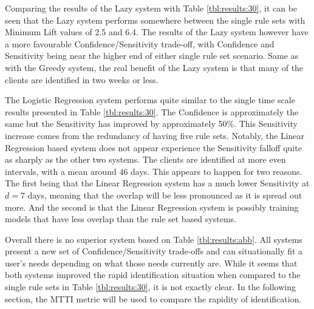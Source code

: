 Comparing the results of the Lazy system with Table \ref{tbl:results:30}, it can be seen that the Lazy system performs somewhere between the single rule sets with Minimum Lift values of 2.5 and 6.4. The results of the Lazy system however have a more favourable Confidence/Sensitivity trade-off, with Confidence and Sensitivity being near the higher end of either single rule set scenario. Same as with the Greedy system, the real benefit of the Lazy system is that many of the clients are identified in two weeks or less.

The Logistic Regression system performs quite similar to the single time scale results presented in Table \ref{tbl:results:30}. The Confidence is approximately the same but the Sensitivity has improved by approximately 50\%. This Sensitivity increase comes from the redundancy of having five rule sets. Notably, the Linear Regression based system does not appear experience the Sensitivity falloff quite as sharply as the other two systems. The clients are identified at more even intervals, with a mean around 46 days. This appears to happen for two reasons. The first being that the Linear Regression system has a much lower Sensitivity at $d=7$ days, meaning that the overlap will be less pronounced as it is spread out more. And the second is that the Linear Regression system is possibly training models that have less overlap than the rule set based systems. 

Overall there is no superior system based on Table \ref{tbl:results:abb}. All systems present a new set of Confidence/Sensitivity trade-offs and can situationally fit a user's needs depending on what those needs currently are. While it seems that both systems improved the rapid identification situation when compared to the single rule sets in Table \ref{tbl:results:30}, it is not exactly clear. In the following section, the MTTI metric will be used to compare the rapidity of identification.

